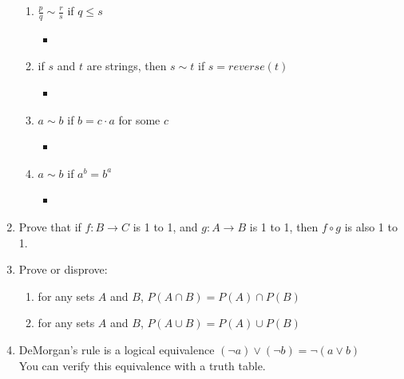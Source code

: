 \documentclass[basic, header]{nosvagor-notes}
\begin{document}
\begin{enumerate}[itemsep=5em]
\begin{enumerate}
      \item $\frac p q \sim \frac r s$ if $q \le s$
        \begin{itemize}
          \item
        \end{itemize}

      \item if $s$ and $t$ are strings, then $s \sim t$ if $s = reverse(t)$
        \begin{itemize}
          \item
        \end{itemize}

      \item $a \sim b$ if $b = c \cdot a$ for some $c$
        \begin{itemize}
          \item
        \end{itemize}

      \item $a \sim b$ if $a^b = b^a$
        \begin{itemize}
          \item
        \end{itemize}

    \end{enumerate}

  \newpage %

    \item Prove that if $f : B \to C$ is 1 to 1, and $g : A \to B$ is 1 to 1,
      then $f \circ g$ is also 1 to 1.

    \item Prove or disprove:
      \begin{enumerate}
        \item for any sets $A$ and $B$, $P(A\cap B) = P(A) \cap P(B)$

        \item for any sets $A$ and $B$, $P(A\cup B) = P(A) \cup P(B)$

      \end{enumerate}

  \newpage %

    \item DeMorgan's rule is a logical equivalence $(\lnot a) \lor (\lnot b) =
      \lnot (a \lor b)$\\ You can verify this equivalence with a truth table.


\end{enumerate}
\end{document}
